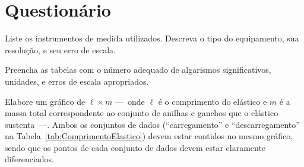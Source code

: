\begin{fullwidth}
\noindent{}
\vspace{5mm}

\noindent{}

\noindent{}

\noindent{}

\noindent{}

\noindent{}
\end{fullwidth}

\vspace{5mm}

\section{Questionário}

\begin{question}[type={exam}]{1}
Liste os instrumentos de medida utilizados. Descreva o tipo do equipamento, sua resolução, e seu erro de escala.
\end{question}

\begin{question}[type={exam}]{2}
Preencha as tabelas com o número adequado de algarismos significativos, unidades, e erros de escala apropriados. 
\end{question}

\begin{question}[type={exam}]{3}
Elabore um gráfico de $\ell \times m$ ---~onde $\ell$ é o comprimento do elástico e $m$ é a massa total correspondente ao conjunto de anilhas e ganchos que o elástico sustenta~---. Ambos os conjuntos de dados (``carregamento'' e ``descarregamento'' na Tabela~\ref{tab:ComprimentoElastico}) devem estar contidos no mesmo gráfico, sendo que os pontos de cada conjunto de dados devem estar claramente diferenciados.
\end{question}

